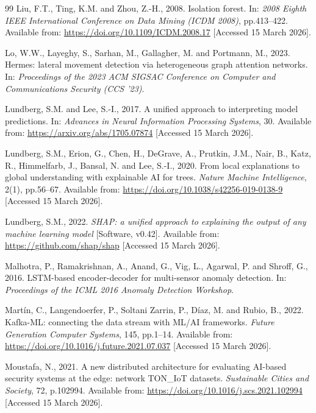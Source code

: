 \documentclass[12pt,a4paper]{report}
\begin{document}
\begin{thebibliography}{99}
Liu, F.T., Ting, K.M. and Zhou, Z.-H., 2008. Isolation forest. In: \textit{2008 Eighth IEEE International Conference on Data Mining (ICDM 2008)}, pp.413--422. Available from: \url{https://doi.org/10.1109/ICDM.2008.17} [Accessed 15 March 2026].

Lo, W.W., Layeghy, S., Sarhan, M., Gallagher, M. and Portmann, M., 2023. Hermes: lateral movement detection via heterogeneous graph attention networks. In: \textit{Proceedings of the 2023 ACM SIGSAC Conference on Computer and Communications Security (CCS '23)}.

Lundberg, S.M. and Lee, S.-I., 2017. A unified approach to interpreting model predictions. In: \textit{Advances in Neural Information Processing Systems}, 30. Available from: \url{https://arxiv.org/abs/1705.07874} [Accessed 15 March 2026].

Lundberg, S.M., Erion, G., Chen, H., DeGrave, A., Prutkin, J.M., Nair, B., Katz, R., Himmelfarb, J., Bansal, N. and Lee, S.-I., 2020. From local explanations to global understanding with explainable AI for trees. \textit{Nature Machine Intelligence}, 2(1), pp.56--67. Available from: \url{https://doi.org/10.1038/s42256-019-0138-9} [Accessed 15 March 2026].

Lundberg, S.M., 2022. \textit{SHAP: a unified approach to explaining the output of any machine learning model} [Software, v0.42]. Available from: \url{https://github.com/shap/shap} [Accessed 15 March 2026].

Malhotra, P., Ramakrishnan, A., Anand, G., Vig, L., Agarwal, P. and Shroff, G., 2016. LSTM-based encoder-decoder for multi-sensor anomaly detection. In: \textit{Proceedings of the ICML 2016 Anomaly Detection Workshop}.

Mart\'{i}n, C., Langendoerfer, P., Soltani Zarrin, P., D\'{i}az, M. and Rubio, B., 2022. Kafka-ML: connecting the data stream with ML/AI frameworks. \textit{Future Generation Computer Systems}, 145, pp.1--14. Available from: \url{https://doi.org/10.1016/j.future.2021.07.037} [Accessed 15 March 2026].

Moustafa, N., 2021. A new distributed architecture for evaluating AI-based security systems at the edge: network TON\_IoT datasets. \textit{Sustainable Cities and Society}, 72, p.102994. Available from: \url{https://doi.org/10.1016/j.scs.2021.102994} [Accessed 15 March 2026].


\end{thebibliography}
\end{document}
